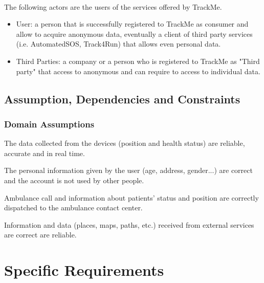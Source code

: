\documentclass[a4paper]{article}
\begin{document}
\paragraph{}The following actors are the users of the services offered by TrackMe. 


\begin{itemize}
    \item User:  a person that is successfully registered to TrackMe as consumer and allow to acquire anonymous data, eventually a client of third party services (i.e. AutomatedSOS, Track4Run) that allows even personal data.
    
    \item Third Parties:  a company or a person who is registered to TrackMe as "Third party" that access to anonymous and can require to access to individual data.
\end{itemize}

\vspace{2cm}

\subsection{Assumption, Dependencies and Constraints}

\subsubsection{Domain Assumptions}

\begin{enumerate}[label={[D.\arabic*]}]
    
    \item The data collected from the devices (position and health status) are reliable, accurate and in real time.
    \item The personal information given by the user (age, address, gender...) are correct and the account is not used by other people. 
    \item Ambulance call and information about patients' status and position are correctly dispatched to the ambulance contact center.
    \item Information and data (places, maps, paths, etc.) received from external services are correct are reliable.
    
\end{enumerate}
\clearpage

\section{Specific Requirements}
\end{document}
